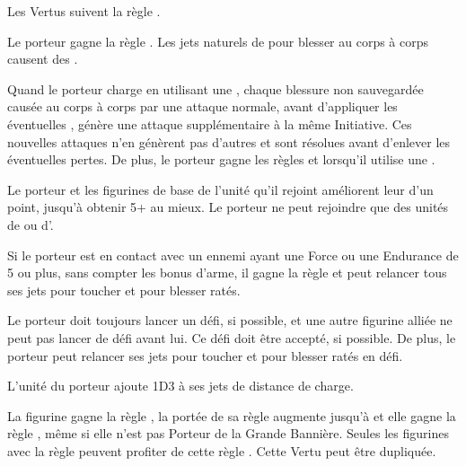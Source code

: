 \closearmyspecialrules







\vspace{0.5cm}

\begin{center}Les Vertus suivent la règle \oneperarmy{}.\end{center}

\begin{multicols}{2}\raggedcolumns
\startpricelistNSP

 Le porteur gagne la règle . Les jets naturels de  pour blesser au corps à corps causent des \multiplewounds{\ordnance}{}.

 Quand le porteur charge en utilisant une \lance{}, chaque blessure non sauvegardée causée au corps à corps par une attaque normale, avant d'appliquer les éventuelles \multiplewounds{}{}, génère une attaque supplémentaire à la même Initiative. Ces nouvelles attaques n'en génèrent pas d'autres et sont résolues avant d'enlever les éventuelles pertes. De plus, le porteur gagne les règles \devastatingcharge{} et \thunderouscharge{} lorsqu'il utilise une \lance{}.

 Le porteur et les figurines de base de l'unité qu'il rejoint améliorent leur \wardsave{} d'un point, jusqu'à obtenir 5+ au mieux. Le porteur ne peut rejoindre que des unités de \cavalry{} ou d'\infantry{}.

 Si le porteur est en contact avec un ennemi ayant une Force ou une Endurance de 5 ou plus, sans compter les bonus d'arme, il gagne la règle \stubborn{} et peut relancer tous ses jets pour toucher et pour blesser ratés.

\columnbreak
{} Le porteur doit toujours lancer un défi, si possible, et une autre figurine alliée ne peut pas lancer de défi avant lui. Ce défi doit être accepté, si possible. De plus, le porteur peut relancer ses jets pour toucher et pour blesser ratés en défi.

 L'unité du porteur ajoute 1D3 à ses jets de distance de charge.

 La figurine gagne la règle \insignificant{}, la portée de sa règle \inspiringpresence{} augmente jusqu'à  et elle gagne la règle \holdyourground{}, même si elle n'est pas Porteur de la Grande Bannière. Seules les figurines avec la règle \insignificant{} peuvent profiter de cette règle \holdyourground{}. Cette Vertu peut être dupliquée.

\endpricelistNSP
\end{multicols}

